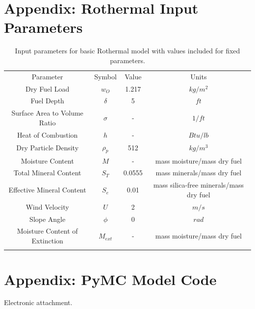 \documentclass[11pt]{article}
\begin{document}
\clearpage
\appendix
\section{Appendix: Rothermal Input Parameters}
\label{ap:table}

\begin{table}[h]
\caption{Input parameters for basic Rothermal model with values included for fixed parameters.}
\begin{center}
  \begin{tabular}{cccc}
    \hline\noalign{\smallskip}
    Parameter & Symbol & Value & Units \\
    \noalign{\smallskip}\hline\noalign{\smallskip}
    Dry Fuel Load & $w_O$ & 1.217 & $kg/m^2$ \\
    Fuel Depth & $\delta$ & 5 & $ft$ \\ 
    Surface Area to Volume Ratio & $\sigma$ & - & $1/ft$ \\ 
    Heat of Combustion & $h$ & - & $Btu/lb$ \\ 
    Dry Particle Density & $\rho_p$ & 512 & $kg/m^3$\\ 
    Moisture Content & $M$ & - & mass moisture/mass dry fuel \\ 
    Total Mineral Content & $S_T$ & 0.0555 & mass minerals/mass dry fuel \\
    Effective Mineral Content & $S_e$ & 0.01 & mass silica-free minerals/mass dry fuel \\
    Wind Velocity & $U$ & 2 & $m/s$ \\
    Slope Angle & $\phi$ & 0 & $rad$ \\
    Moisture Content of Extinction & $M_{ext}$ & - & mass moisture/mass dry fuel \\
    \noalign{\smallskip}\hline
  \end{tabular}
\end{center}
\label{tab:para}
\end{table}

\section{Appendix: PyMC Model Code}

Electronic attachment.



\end{document}
